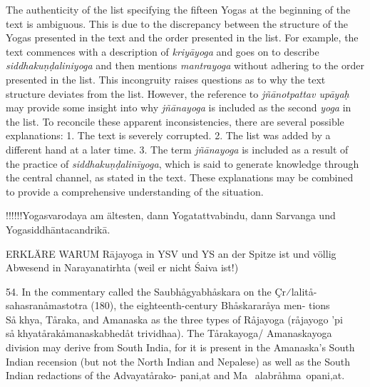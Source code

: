 {The authenticity of the list specifying the fifteen Yogas at the beginning of the text is ambiguous. This is due to the discrepancy between the structure of the Yogas presented in the text and the order presented in the list. For example, the text commences with a description of \textit{kriyāyoga} and goes on to describe \textit{siddhakuṇḍaliniyoga} and then mentions \textit{mantrayoga} without adhering to the order presented in the list. This incongruity raises questions as to why the text structure deviates from the list. However, the reference to \textit{jñānotpattav upāyaḥ} may provide some insight into why \textit{jñānayoga} is included as the second \textit{yoga} in the list. To reconcile these apparent inconsistencies, there are several possible explanations: 1. The text is severely corrupted. 2. The list was added by a different hand at a later time. 3. The term \textit{jñānayoga} is included as a result of the practice of \textit{siddhakuṇḍalinīyoga}, which is said to generate knowledge through the central channel, as stated in the text. These explanations may be combined to provide a comprehensive understanding of the situation.


!!!!!!Yogasvarodaya am ältesten, dann Yogatattvabindu, dann Sarvanga und Yogasiddhāntacandrikā.  

ERKLÄRE WARUM Rājayoga in YSV und YS an der Spitze ist und völlig Abwesend in Narayanatirhta (weil er nicht Śaiva ist!)

54. In the commentary called the Saubhågyabhåskara on the Çr⁄lalitå-
sahasranåmastotra (180), the eighteenth-century Bhåskararåya men-
tions Såkhya, Tåraka, and Amanaska as the three types of Råjayoga
(råjayogo ’pi såkhyatårakåmanaskabhedåt trividhaa). The Tårakayoga/
Amanaskayoga division may derive from South India, for it is present in
the Amanaska’s South Indian recension (but not the North Indian and
Nepalese) as well as the South Indian redactions of the Advayatårako-
pani‚at and Ma~alabråhma~opani‚at.

}
